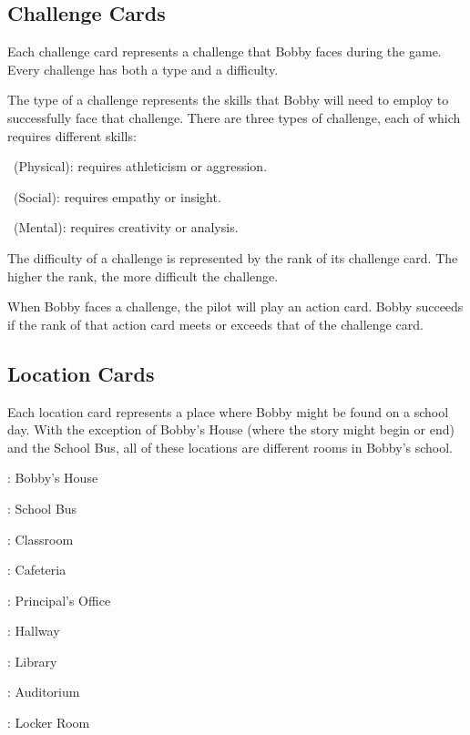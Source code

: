\subsection{Challenge Cards}
Each challenge card represents a challenge that Bobby faces during the game. Every challenge has both a type and a difficulty.

The type of a challenge represents the skills that Bobby will need to employ to successfully face that challenge. There are three types of challenge, each of which requires different skills:
\begin{challengetypelist}[itemsep=0pt]
	\item[\clubs\ (Physical):] requires athleticism or aggression. 
	\item[\hearts\ (Social):] requires empathy or insight.
	\item[\spades\ (Mental):] requires creativity or analysis.
\end{challengetypelist}

The difficulty of a challenge is represented by the rank of its challenge card. The higher the rank, the more difficult the challenge.

When Bobby faces a challenge, the pilot will play an action card. Bobby succeeds if the rank of that action card meets or exceeds that of the challenge card.

\subsection{Location Cards}

Each location card represents a place where Bobby might be found on a school day. With the exception of Bobby's House (where the story might begin or end) and the School Bus, all of these locations are different rooms in Bobby's school. 
\vspace{-1.75ex}
\begin{multicols}{2}
\begin{cardlist}[itemsep=0pt, topsep=0pt, partopsep=0pt]
  \item[\redtwo\diamonds:] Bobby's House
  \item[\redthree\diamonds:] School Bus
  \item[\redfour\diamonds:] Classroom
  \item[\redfive\diamonds:] Cafeteria
  \item[\redsix\diamonds:] Principal's Office
  \item[\redseven\diamonds:] Hallway
  \item[\redeight\diamonds:] Library
  \item[\rednine\diamonds:] Auditorium
  \item[\redten\diamonds:] Locker Room
  \item[]
\end{cardlist}
\end{multicols}

